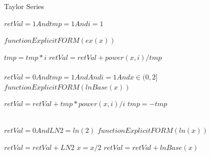 \documentclass[letterpaper, 11pt]{report}
\begin{document}
\begin{algorithm}
\caption{Taylor Series}
\begin{algorithmic}
\Require $retVal=1 And tmp=1 And i=1$

\State $function Explicit FORM(ex(x))$

\State $tmp=tmp*i$
\State $retVal=retVal+power(x,i)/tmp$
\EndFor \\
\\
\EndFunction
\Require $retVal=0 And tmp=1 And And i=1 And x∈(0,2]$
\State $function Explicit FORM(lnBase(x))$

\State $retVal=retVal+tmp*power(x,i)/i$
\State $tmp=-tmp$
\EndFor \\
\\
\EndFunction

\Require $retVal=0 And LN2=ln(2)$
\State $function Explicit FORM(ln(x))$


    \State $retVal=retVal+LN2$
    \State $x=x/2$  
\EndWhile
    \State $retVal=retVal+lnBase(x)$\\
\EndFunction
\end{algorithmic}
\end{algorithm}
\end{document}
